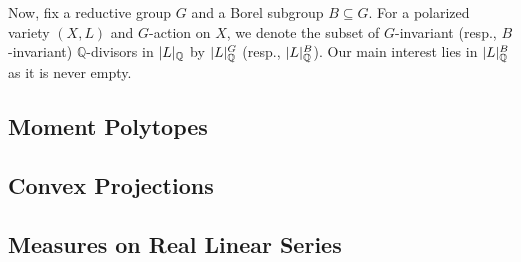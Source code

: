 Now, fix a reductive group $G$ and a Borel subgroup $B \subseteq G$. For a polarized variety $(X, L)$ and $G$-action on $X$, we denote the subset of $G$-invariant (resp., $B$-invariant) $\mathbb{Q}$-divisors in $\mathopen{}\left|L\right|\mathclose{}_\mathbb{Q}$ by $\mathopen{}\left|L\right|\mathclose{}_\mathbb{Q}^G$ (resp., $\mathopen{}\left|L\right|\mathclose{}_\mathbb{Q}^B$). Our main interest lies in $\mathopen{}\left|L\right|\mathclose{}_\mathbb{Q}^B$ as it is never empty.

\subsection{Moment Polytopes}\label{sec:Qls:mome}


\subsection{Convex Projections}\label{sec:Qls:proj}


\subsection{Measures on Real Linear Series}\label{sec:Qls:meas}

